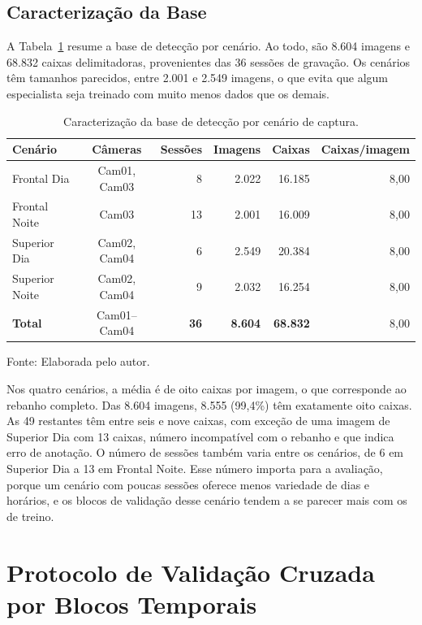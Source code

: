 \subsection{Caracterização da Base}
\label{subsec:caracterizacao-base}

A Tabela~\ref{tab:dataset-deteccao} resume a base de detecção por cenário. Ao todo, são 8.604 imagens e 68.832 caixas delimitadoras, provenientes das 36 sessões de gravação. Os cenários têm tamanhos parecidos, entre 2.001 e 2.549 imagens, o que evita que algum especialista seja treinado com muito menos dados que os demais.

\begin{table}[htb]
\centering
\caption{Caracterização da base de detecção por cenário de captura.}
\label{tab:dataset-deteccao}
\begin{tabular}{lcrrrr}
\hline
\textbf{Cenário} & \textbf{Câmeras} & \textbf{Sessões} & \textbf{Imagens} & \textbf{Caixas} & \textbf{Caixas/imagem} \\
\hline
Frontal Dia & Cam01, Cam03 & 8 & 2.022 & 16.185 & 8,00 \\
Frontal Noite & Cam03 & 13 & 2.001 & 16.009 & 8,00 \\
Superior Dia & Cam02, Cam04 & 6 & 2.549 & 20.384 & 8,00 \\
Superior Noite & Cam02, Cam04 & 9 & 2.032 & 16.254 & 8,00 \\
\hline
\textbf{Total} & Cam01--Cam04 & \textbf{36} & \textbf{8.604} & \textbf{68.832} & 8,00 \\
\hline
\end{tabular}

\vspace{0.2cm}
Fonte: Elaborada pelo autor.
\end{table}

Nos quatro cenários, a média é de oito caixas por imagem, o que corresponde ao rebanho completo. Das 8.604 imagens, 8.555 (99,4\%) têm exatamente oito caixas. As 49 restantes têm entre seis e nove caixas, com exceção de uma imagem de Superior Dia com 13 caixas, número incompatível com o rebanho e que indica erro de anotação. O número de sessões também varia entre os cenários, de 6 em Superior Dia a 13 em Frontal Noite. Esse número importa para a avaliação, porque um cenário com poucas sessões oferece menos variedade de dias e horários, e os blocos de validação desse cenário tendem a se parecer mais com os de treino.

\section{Protocolo de Validação Cruzada por Blocos Temporais}
\label{sec:protocolo-validacao}

